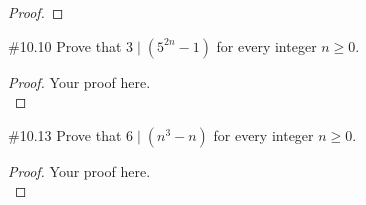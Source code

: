\documentclass[11pt]{report}
\theoremstyle{plain}
\begin{document}
\begin{description}
\begin{proof}
\end{proof}

\item{\#10.10} Prove that $3 \mid (5^{2n}-1)$ for every integer $n\geq 0.$\\
\begin{proof}   Your proof here. \\

\end{proof}

\item{\#10.13} Prove that $6 \mid (n^3-n)$ for every integer $n \geq 0.$\\
\begin{proof}  Your proof here. \\

\end{proof}

\end{description}
\end{document}
